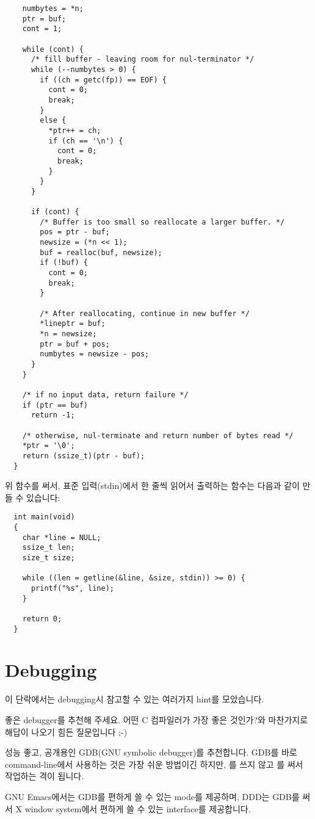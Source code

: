 \begin{faq}
\begin{verbatim}
    numbytes = *n;
    ptr = buf;
    cont = 1;

    while (cont) {
      /* fill buffer - leaving room for nul-terminator */
      while (--numbytes > 0) {
        if ((ch = getc(fp)) == EOF) {
          cont = 0;
          break;
        }
        else {
          *ptr++ = ch;
          if (ch == '\n') {
            cont = 0;
            break;
          }
        }
      }

      if (cont) {
        /* Buffer is too small so reallocate a larger buffer. */
        pos = ptr - buf;
        newsize = (*n << 1);
        buf = realloc(buf, newsize);
        if (!buf) {
          cont = 0;
          break;
        }

        /* After reallocating, continue in new buffer */
        *lineptr = buf;
        *n = newsize;
        ptr = buf + pos;
        numbytes = newsize - pos;
      }
    }

    /* if no input data, return failure */
    if (ptr == buf)
      return -1;

    /* otherwise, nul-terminate and return number of bytes read */
    *ptr = '\0';
    return (ssize_t)(ptr - buf);
  }
\end{verbatim}

	\noindent 위 함수를 써서, 표준 입력(stdin)에서 한 줄씩 읽어서 출력하는 함수는
        다음과 같이 만들 수 있습니다:

\begin{verbatim}
  int main(void)
  {
    char *line = NULL;
    ssize_t len;
    size_t size;

    while ((len = getline(&line, &size, stdin)) >= 0) {
      printf("%s", line);
    }

    return 0;
  }
\end{verbatim}

\R
	\cite{glibc} 
\end{faq}

\section{Debugging}	\label{sec:debugging}
이 단락에서는 debugging시 참고할 수 있는 여러가지 hint를 모았습니다.

\begin{faq}	\label{faq:good-debugger}
	좋은 debugger를 추천해 주세요.
\A
	어떤 C 컴파일러가 가장 좋은 것인가?와 마찬가지로 해답이 나오기
	힘든 질문입니다 ;-)


	성능 좋고, 공개용인 GDB(GNU symbolic debugger)를 추천합니다.
	GDB를 바로 command-line에서 사용하는 것은 가장 쉬운 방법이긴
	하지만, 를 쓰지 않고 를 써서 작업하는 격이 됩니다.

	GNU Emacs에서는 GDB를 편하게 쓸 수 있는 mode를 제공하며,
	DDD는 GDB를 써서 X window system에서 편하게 쓸 수 있는
	interface를 제공합니다.

\end{faq}


